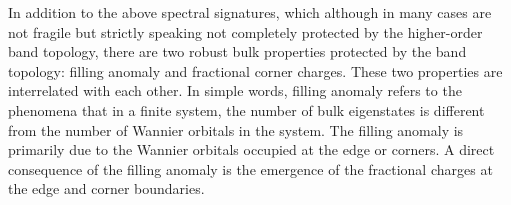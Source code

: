\documentclass[doublecol]{epl2}
\begin{document}
In addition to the above spectral signatures, which although in many cases are not fragile but strictly speaking not completely protected by the higher-order band topology, there are two robust bulk properties protected by the band topology: filling anomaly and fractional corner charges. These two properties are interrelated with each other. In simple words, filling anomaly refers to the phenomena that in a finite system, the number of bulk eigenstates is different from the number of Wannier orbitals in the system. The filling anomaly is primarily due to the Wannier orbitals occupied at the edge or corners. A direct consequence of the filling anomaly is the emergence of the fractional charges at the edge and corner boundaries. 

\end{document}

